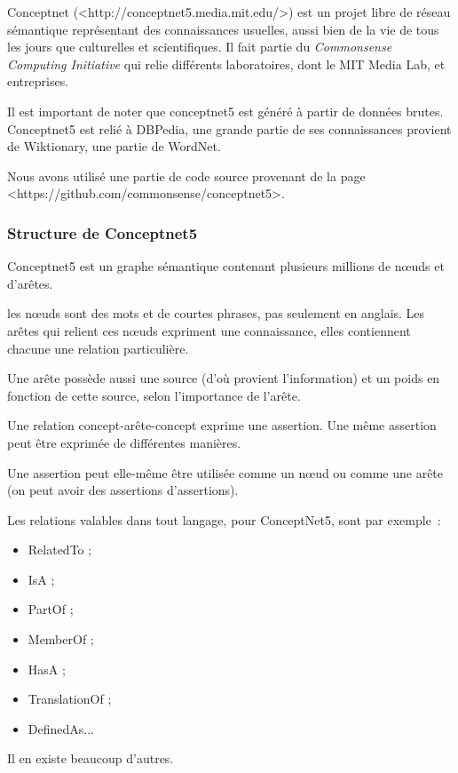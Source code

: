 \documentclass[a4paper,12pt]{article}
\newcommand{\ang}[1]{\textit{#1}}%
\begin{document}
Conceptnet (<http://conceptnet5.media.mit.edu/>) est un projet libre de réseau sémantique représentant des connaissances usuelles, aussi bien de la vie de tous les jours que culturelles et scientifiques. Il fait partie du \ang{Commonsense Computing Initiative} qui relie différents laboratoires, dont le MIT Media Lab, et entreprises.

Il est important de noter que conceptnet5 est généré à partir de données brutes. Conceptnet5 est relié à DBPedia, une grande partie de ses connaissances provient de Wiktionary, une partie de WordNet.

Nous avons utilis\'e une partie de code source provenant de la page <https://github.com/commonsense/conceptnet5>.


\subsubsection{Structure de Conceptnet5}

Conceptnet5 est un graphe sémantique contenant plusieurs millions de nœuds et d'ar\^etes.

les n\oe{}uds sont des mots et de courtes phrases, pas seulement en anglais. Les arêtes qui relient ces n\oe{}uds expriment une connaissance, elles contiennent chacune une relation particulière.

Une arête possède aussi une source (d'où provient l'information) et un poids en fonction de cette source, selon l'importance de l'arête.

Une relation concept-arête-concept exprime une assertion. Une même assertion peut être exprimée de différentes manières.

Une assertion peut elle-même être utilisée comme un n\oe{}ud ou comme une arête (on peut avoir des assertions d'assertions).

Les relations valables dans tout langage, pour ConceptNet5, sont par exemple~: 
\begin{itemize}
 \item RelatedTo ;
 \item IsA ;
 \item PartOf ;
 \item MemberOf ;
 \item HasA ;
 \item TranslationOf ;
 \item DefinedAs...
\end{itemize}

Il en existe beaucoup d'autres.
\end{document}
